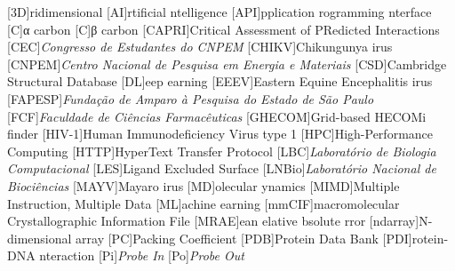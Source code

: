 \documentclass[Ingles]{phdthesis}
\begin{document}
\listoftables
\clearpage


\begin{acronym} \itemsep=-8pt
  [3D]{ridimensional}
  [AI]{rtificial ntelligence}
  [API]{pplication rogramming nterface}
  [C\textalpha]{α carbon}
  [C\textbeta]{β carbon}
  [CAPRI]{Critical Assessment of PRedicted Interactions}
  [CEC]{\textit{Congresso de Estudantes do CNPEM}}
  [CHIKV]{Chikungunya irus}
  [CNPEM]{\textit{Centro Nacional de Pesquisa em Energia e Materiais}}
  [CSD]{Cambridge Structural Database}
  [DL]{eep earning}
  [EEEV]{Eastern Equine Encephalitis irus}
  [FAPESP]{\textit{Fundação de Amparo à Pesquisa do Estado de São Paulo}}
  [FCF]{\textit{Faculdade de Ciências Farmacêuticas}}
  [GHECOM]{Grid-based HECOMi finder}
  [HIV-1]{Human Immunodeficiency Virus type 1}
  [HPC]{High-Performance Computing}
  [HTTP]{HyperText Transfer Protocol}
  [LBC]{\textit{Laboratório de Biologia Computacional}}
  [LES]{Ligand Excluded Surface}
  [LNBio]{\textit{Laboratório Nacional de Biociências}}
  [MAYV]{Mayaro irus}
  [MD]{olecular ynamics}
  [MIMD]{Multiple Instruction, Multiple Data}
  [ML]{achine earning}
  [mmCIF]{macromolecular Crystallographic Information File}
  [MRAE]{ean elative bsolute rror}
  [ndarray]{N-dimensional array}
  [PC]{Packing Coefficient}
  [PDB]{Protein Data Bank}
  [PDI]{rotein-DNA nteraction}
  [Pi]{\textit{Probe In}}
  [Po]{\textit{Probe Out}}

\end{acronym}
\end{document}
